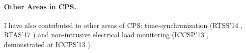 \documentclass[10pt]{article}
\begin{document}
\paragraph{Other Areas in CPS. }
I have also contributed to other areas of CPS:
time-synchronization (RTSS'14 \cite{buevich2013hardware}, RTAS'17 \cite{dongare2017pulsar}) and non-intrusive electrical load
monitoring (ICCSP'13 \cite{rajagopal2013magnetic}, demonstrated at ICCPS'13 \cite{rajagopal2013demo}).



\end{document}
